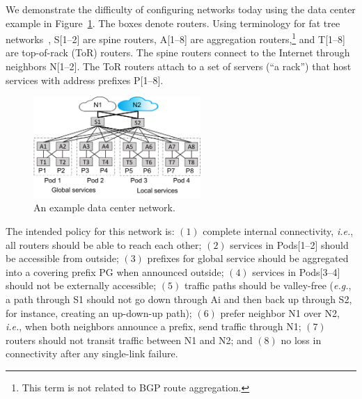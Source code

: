 \documentclass[numbers, 10pt]{sigplanconf}
\newcommand{\todo}[1]{\textcolor{red}{[TODO: #1]}}
\newcommand{\EG}{\emph{e.g.}}
\newcommand{\IE}{\emph{i.e.}}
\begin{document}
We demonstrate the difficulty of configuring networks today using the data center example in Figure~\ref{fig:example}. The boxes denote routers. Using terminology for fat tree networks~\cite{fattree}, S[1--2] are spine routers, A[1--8] are aggregation routers,\footnote{This term is not related to BGP route aggregation.} and T[1--8] are top-of-rack (ToR) routers. The spine routers connect to the Internet through neighbors N[1--2].
The ToR routers attach to a set of servers (``a rack'') that host services with address prefixes P[1--8].



\begin{figure}[t!]
  \centering
  \includegraphics[width=2.5in]{figures/example}
  \vspace{-.8em}
  \caption{An example data center network.}
  \label{fig:example}
  \vspace{-.8em}
\end{figure}

The intended policy for this network is:
$(1)$ complete internal connectivity, \IE, all routers should be able to reach each other;
$(2)$ services in Pods[1--2] should be accessible from outside;
$(3)$ prefixes for global service should be aggregated into a covering prefix PG when announced outside;
$(4)$ services in Pods[3--4] should not be externally accessible;
$(5)$ traffic paths should be valley-free (\EG, a path through S1 should
not go down through Ai and then back up through S2, for instance, 
creating an up-down-up path);
$(6)$ prefer neighbor N1 over N2, \IE, when both neighbors announce a prefix, send traffic through N1;
$(7)$ routers should not transit traffic between N1 and N2; and
$(8)$ no loss in connectivity after any single-link failure.
\end{document}
